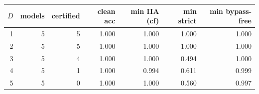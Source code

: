 \begin{tabular}{rrrrrrr}\toprule
$D$ & models & certified & clean acc & min IIA (cf) & min strict & min bypass-free\\\midrule
1 & 5 & 5 & 1.000 & 1.000 & 1.000 & 1.000\\
2 & 5 & 5 & 1.000 & 1.000 & 1.000 & 1.000\\
3 & 5 & 4 & 1.000 & 1.000 & 0.494 & 1.000\\
4 & 5 & 1 & 1.000 & 0.994 & 0.611 & 0.999\\
5 & 5 & 0 & 1.000 & 1.000 & 0.560 & 0.997\\
\bottomrule\end{tabular}
